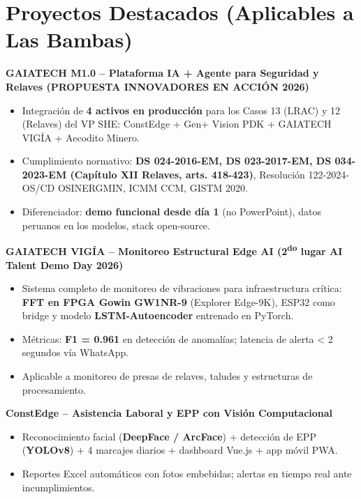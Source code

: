 \documentclass[10pt, a4paper]{article}
\begin{document}
\section*{Proyectos Destacados (Aplicables a Las Bambas)}

\textbf{GAIATECH M1.0 -- Plataforma IA + Agente para Seguridad y Relaves (PROPUESTA INNOVADORES EN ACCIÓN 2026)}
\begin{itemize}
    \item Integración de \textbf{4 activos en producción} para los Casos 13 (LRAC) y 12 (Relaves) del VP SHE: ConstEdge + Gen+ Vision PDK + GAIATECH VIGÍA + Aecodito Minero.
    \item Cumplimiento normativo: \textbf{DS 024-2016-EM, DS 023-2017-EM, DS 034-2023-EM (Capítulo XII Relaves, arts. 418-423)}, Resolución 122-2024-OS/CD OSINERGMIN, ICMM CCM, GISTM 2020.
    \item Diferenciador: \textbf{demo funcional desde día 1} (no PowerPoint), datos peruanos en los modelos, stack open-source.
\end{itemize}

\vspace{1mm}

\textbf{GAIATECH VIGÍA -- Monitoreo Estructural Edge AI (2\textsuperscript{do} lugar AI Talent Demo Day 2026)}
\begin{itemize}
    \item Sistema completo de monitoreo de vibraciones para infraestructura crítica: \textbf{FFT en FPGA Gowin GW1NR-9} (Explorer Edge-9K), ESP32 como bridge y modelo \textbf{LSTM-Autoencoder} entrenado en PyTorch.
    \item Métricas: \textbf{F1 = 0.961} en detección de anomalías; latencia de alerta < 2 segundos vía WhatsApp.
    \item Aplicable a monitoreo de presas de relaves, taludes y estructuras de procesamiento.
\end{itemize}

\vspace{1mm}

\textbf{ConstEdge -- Asistencia Laboral y EPP con Visión Computacional}
\begin{itemize}
    \item Reconocimiento facial (\textbf{DeepFace / ArcFace}) + detección de EPP (\textbf{YOLOv8}) + 4 marcajes diarios + dashboard Vue.js + app móvil PWA.
    \item Reportes Excel automáticos con fotos embebidas; alertas en tiempo real ante incumplimientos.
\end{itemize}
\end{document}
